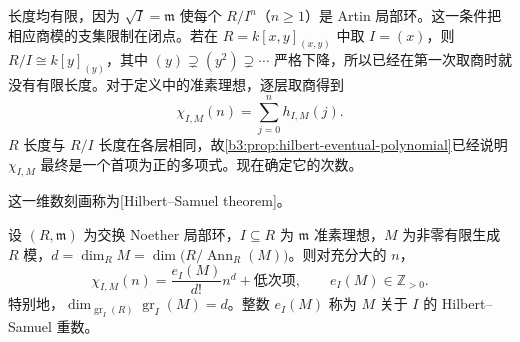 长度均有限，因为 \(\sqrt I=\mathfrak m\) 使每个 \(R/I^n\)（\(n\ge1\)）是 Artin 局部环。这一条件把相应商模的支集限制在闭点。若在 \(R=k[x,y]_{(x,y)}\) 中取 \(I=(x)\)，则 \(R/I\cong k[y]_{(y)}\)，其中 \((y)\supsetneq(y^2)\supsetneq\cdots\) 严格下降，所以已经在第一次取商时就没有有限长度。对于定义中的准素理想，逐层取商得到
\begin{equation}\label{b3:eq:samuel-cumulative}
	\chi_{I,M}(n)=\sum_{j=0}^n h_{I,M}(j).
\end{equation}
\(R\) 长度与 \(R/I\) 长度在各层相同，故\cref{b3:prop:hilbert-eventual-polynomial}已经说明 \(\chi_{I,M}\) 最终是一个首项为正的多项式。现在确定它的次数。

\ProseParagraphBreak
这一维数刻画称为[Hilbert--Samuel theorem]。

\begin{theorem}\label{b3:thm:hilbert-samuel}
	设 \((R,\mathfrak m)\) 为交换 Noether 局部环，\(I\subseteq R\) 为 \(\mathfrak m\) 准素理想，\(M\) 为非零有限生成 \(R\) 模，\(d=\dim_R M=\dim\bigl(R/\operatorname{Ann}_R(M)\bigr)\)。则对充分大的 \(n\)，
	\[
		\chi_{I,M}(n)=\dfrac{e_I(M)}{d!}n^d+\text{低次项}, \qquad e_I(M)\in\mathbb Z_{>0}.
	\]
	特别地，\(\dim_{\operatorname{gr}_I(R)}\operatorname{gr}_I(M)=d\)。整数 \(e_I(M)\) 称为 \(M\) 关于 \(I\) 的 Hilbert–Samuel 重数。
\end{theorem}
